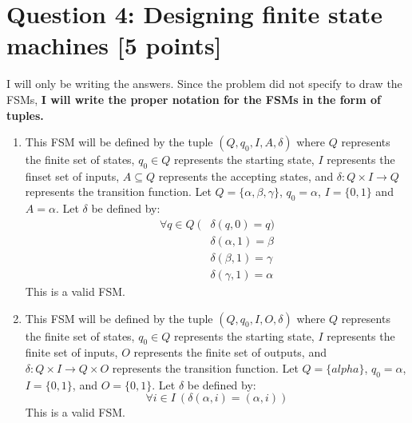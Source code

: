 \documentclass{report}
\theoremstyle{mytheoremstyle}
\theoremstyle{mytheoremstyle}
\theoremstyle{myproblemstyle}
\begin{document}
\section*{Question 4: Designing finite state machines [5 points]}
I will only be writing the answers. Since the problem did not specify to draw the FSMs, \textbf{I will write the proper notation for the FSMs in the form of tuples.}
\begin{enumerate}
    \item This FSM will be defined by the tuple $(Q, q_0, I, A, \delta)$ where $Q$ represents the finite set of states, $q_0\in Q$ represents the starting state, $I$ represents the finset set of inputs, $A\subseteq Q$ represents the accepting states, and $\delta\colon Q\times I\rightarrow Q$ represents the transition function.
        Let $Q=\{\alpha,\beta,\gamma\}$, $q_0=\alpha$, $I=\{0,1\}$ and $A=\alpha$. Let $\delta$ be defined by:
        \begin{align}
            \forall q\in Q\:(&\delta(q,0)=q) \\
            &\delta(\alpha,1)=\beta \\
            &\delta(\beta,1)=\gamma \\
            &\delta(\gamma,1)=\alpha
        \end{align} This is a valid FSM.
    \item This FSM will be defined by the tuple $(Q, q_0, I, O, \delta)$ where $Q$ represents the finite set of states, $q_0\in Q$ represents the starting state, $I$ represents the finite set of inputs, $O$ represents the finite set of outputs, and $\delta\colon Q\times I\rightarrow Q\times O$ represents the transition function.
        Let $Q=\{alpha\}$, $q_0=\alpha$, $I=\{0,1\}$, and $O=\{0,1\}$. Let $\delta$ be defined by:$$\forall i\in I\:(\delta(\alpha,i)=(\alpha,i))$$
        This is a valid FSM.
\end{enumerate}
\end{document}
